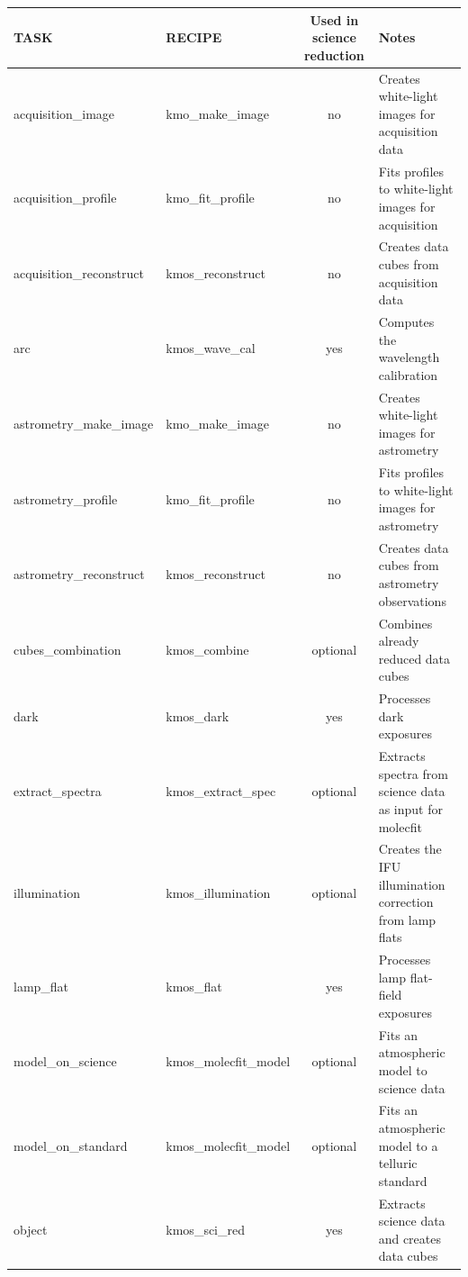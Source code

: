 \begin{table}[htbp]
\centering
\scriptsize
\begin{tabular}{|l|l|c|p{7cm}|}
\hline
\textbf{TASK} & \textbf{RECIPE} & \textbf{Used in science reduction} & \textbf{Notes} \\
\hline
acquisition\_image        & kmo\_make\_image          & no       & Creates white-light images for acquisition data \\
acquisition\_profile      & kmo\_fit\_profile         & no       & Fits profiles to white-light images for acquisition \\
acquisition\_reconstruct  & kmos\_reconstruct         & no       & Creates data cubes from acquisition data \\
arc                       & kmos\_wave\_cal           & yes      & Computes the wavelength calibration \\
astrometry\_make\_image   & kmo\_make\_image          & no       & Creates white-light images for astrometry \\
astrometry\_profile       & kmo\_fit\_profile         & no       & Fits profiles to white-light images for astrometry \\
astrometry\_reconstruct   & kmos\_reconstruct         & no       & Creates data cubes from astrometry observations \\
cubes\_combination        & kmos\_combine             & optional & Combines already reduced data cubes \\
dark                      & kmos\_dark                & yes      & Processes dark exposures \\
extract\_spectra          & kmos\_extract\_spec       & optional & Extracts spectra from science data as input for molecfit \\
illumination              & kmos\_illumination        & optional & Creates the IFU illumination correction from lamp flats \\
lamp\_flat                & kmos\_flat                & yes      & Processes lamp flat-field exposures \\
model\_on\_science        & kmos\_molecfit\_model     & optional & Fits an atmospheric model to science data \\
model\_on\_standard       & kmos\_molecfit\_model     & optional & Fits an atmospheric model to a telluric standard \\
object                    & kmos\_sci\_red            & yes      & Extracts science data and creates data cubes \\

\end{tabular}
\end{table}
